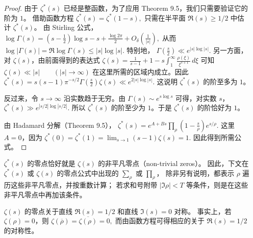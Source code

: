 \begin{proof}
	由于 $\zeta^*(s)$ 已经是整函数，为了应用 Theorem 9.5，我们只需要验证它的阶为 $1$。
	借助函数方程
	\(\textstyle \zeta^*(s)=\allowbreak{}\zeta^*(1-s),\allowbreak{}\)
	只需在半平面 $\Re(s)\geq 1/2$ 中估计 $\zeta^*(s)$。
	由 Stirling 公式，
	\(\textstyle \log\Gamma(s) =\allowbreak{} \left(s-\frac12\right)\log s-s+\allowbreak{}\frac{\log 2\pi}{2} +\allowbreak{}O_\delta\left(\frac1{|s|}\right),\allowbreak{}\)
	从而
	\(\textstyle \log|\Gamma(s)| =\allowbreak{} \Re\log\Gamma(s) \leq\allowbreak{} |s|\log |s|.\)
	特别地，
	\(\textstyle \Gamma\left(\frac{s}{2}\right)\ll\allowbreak{} e^{|s|\log |s|}.\)
	另一方面，对 $\zeta(s)$，由前面得到的表达式
	\(\textstyle \zeta(s) =\allowbreak{} \frac{1}{s-1} +\allowbreak{}1 -s\int_1^\infty \frac{\rho(\xi)}{\xi^{s+\allowbreak{}1}}\,d\xi\)
	可知
	\(\textstyle \zeta(s)\ll\allowbreak{} |s| \qquad (|s|\to\allowbreak{}\infty)\)
	在这里所需的区域内成立。因此
	\(\textstyle \zeta^*(s) =\allowbreak{} s(s-1)\pi^{-s/2}\Gamma\left(\frac{s}{2}\right)\zeta(s) \ll\allowbreak{} e^{2|s|\log |s|}.\)
	这说明 $\zeta^*(s)$ 的阶至多为 $1$。

	反过来，令 $s\to\infty$ 沿实数趋于无穷。由
	\(\textstyle \Gamma(s)\sim\allowbreak{} e^{s\log s}\)
	可得，对实数 $s$，
	\(\textstyle \zeta^*(s)\gg\allowbreak{} e^{|s/2|\log |s/2|}.\)
	所以 $\zeta^*(s)$ 的阶至少为 $1$。于是 $\zeta^*(s)$ 的阶恰好为 $1$。

	由 Hadamard 分解（Theorem 9.5），
	\(\textstyle \zeta^*(s) =\allowbreak{} e^{A+\allowbreak{}Bs}\prod_\rho \left(1-\frac{s}{\rho}\right)e^{s/\rho}.\)
	这里 $A=0$，因为
	\(\textstyle \zeta^*(0)=\allowbreak{}\zeta^*(1) =\allowbreak{} \lim_{s\to1}(s-1)\zeta(s) =\allowbreak{} 1.\)
	因此得到所需公式。
\end{proof}

\begin{remark}
	$\zeta^*(s)$ 的零点恰好就是 $\zeta(s)$ 的非平凡零点（non-trivial zeros）。
	因此，下文在 $\zeta^*(s)$ 或 $\zeta(s)$ 的零点公式中出现的 $\sum_\rho$ 或 $\prod_\rho$，
	除非另有说明，都表示 $\rho$ 遍历这些非平凡零点，并按重数计算；
	若求和号附带 $|\Im\rho|<T$ 等条件，则是在这些非平凡零点中再加该条件。
\end{remark}

\begin{remark}
	$\zeta(s)$ 的零点关于直线 $\Re(s)=1/2$ 和直线 $\Im(s)=0$ 对称。
	事实上，若 $\zeta(\rho)=0$，则
	\(\textstyle \zeta(\overline{\rho}) =\allowbreak{} \overline{\zeta(\rho)} =\allowbreak{} 0,\allowbreak{}\)
	而由函数方程可得相应的关于 $\Re(s)=1/2$ 的对称性。
\end{remark}


